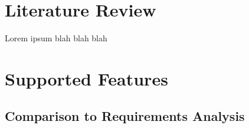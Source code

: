 \documentclass[english,onecolumn]{scrartcl}
\begin{document}
\section{Literature Review}

Lorem ipsum blah blah blah


\section{Supported Features}
\subsection{Comparison to Requirements Analysis}
\end{document}
